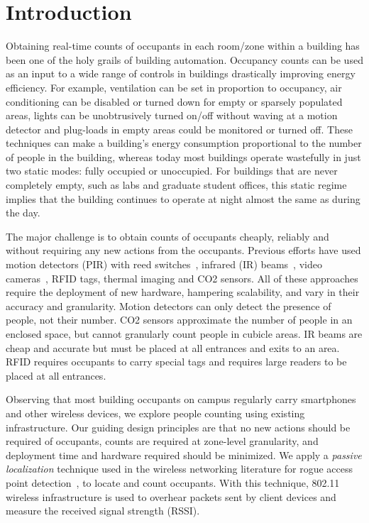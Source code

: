 \section{Introduction}

Obtaining real-time counts of occupants in each room/zone within a building has been one of the holy grails of building automation. Occupancy counts can be used as an input to a wide range of controls in buildings drastically improving energy efficiency. For example,  ventilation can be set in proportion to occupancy, air conditioning can be disabled or turned down for empty or sparsely populated areas, lights can be unobtrusively turned on/off without waving at a motion detector and plug-loads in empty areas could be monitored or turned off. These techniques can make a building's energy consumption proportional to the number of people in the building, whereas today most buildings operate wastefully in just two static modes: fully occupied or unoccupied. For buildings that are never completely empty, such as labs and graduate student offices, this static regime implies that the building continues to operate at night almost the same as during the day.

The major challenge is to obtain counts of occupants cheaply, reliably and without requiring any new actions from the occupants. Previous efforts have used motion detectors (PIR) with reed switches~\cite{Agarwal2010, Lu2010}, infrared (IR) beams~\cite{sun9}, video cameras~\cite{Erickson11}, RFID tags, thermal imaging and CO2 sensors. All of these approaches require the deployment of new hardware, hampering scalability, and vary in their accuracy and granularity. Motion detectors can only detect the presence of people, not their number. CO2 sensors approximate the number of people in an enclosed space, but cannot granularly count people in cubicle areas. IR beams are cheap and accurate but must be placed at all entrances and exits to an area. RFID requires occupants to carry special tags and requires large readers to be placed at all entrances. 

Observing that most building occupants on campus regularly carry smartphones and other wireless devices, we explore people counting using existing infrastructure. Our guiding design principles are that no new actions should be required of occupants,  counts are required at zone-level granularity, and deployment time and hardware required should be minimized. We apply a {\it passive localization} technique used in the wireless networking literature for rogue access point detection~\cite{Faria2006, Laurendeau2010}, to locate and count occupants. With this technique, 802.11 wireless infrastructure is used to overhear packets sent by client devices and measure the received signal strength (RSSI).

